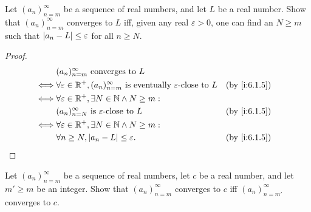 \begin{ex}\label{i:ex:6.1.2}
  Let \((a_n)_{n = m}^\infty\) be a sequence of real numbers, and let \(L\) be a real number.
  Show that \((a_n)_{n = m}^\infty\) converges to \(L\) iff, given any real \(\varepsilon > 0\), one can find an \(N \geq m\) such that \(\left\lvert a_n - L\right\rvert \leq \varepsilon\) for all \(n \geq N\).
\end{ex}

\begin{proof}
  \begin{align*}
         & (a_n)_{n = m}^\infty \text{ converges to } L                                                                               \\
    \iff & \forall \varepsilon \in \R^+, (a_n)_{n = m}^\infty \text{ is eventually } \varepsilon\text{-close to } L &  & \by{i:6.1.5} \\
    \iff & \forall \varepsilon \in \R^+, \exists N \in \N \land N \geq m :                                                            \\
         & (a_n)_{n = N}^\infty \text{ is } \varepsilon\text{-close to } L                                          &  & \by{i:6.1.5} \\
    \iff & \forall \varepsilon \in \R^+, \exists N \in \N \land N \geq m :                                                            \\
         & \forall n \geq N, \abs{a_n - L} \leq \varepsilon.                                                        &  & \by{i:6.1.5}
  \end{align*}
\end{proof}

\begin{ex}\label{i:ex:6.1.3}
  Let \((a_n)_{n = m}^\infty\) be a sequence of real numbers, let \(c\) be a real number, and let \(m' \geq m\) be an integer.
  Show that \((a_n)_{n = m}^\infty\) converges to \(c\) iff \((a_n)_{n = m'}^\infty\) converges to \(c\).
\end{ex}

